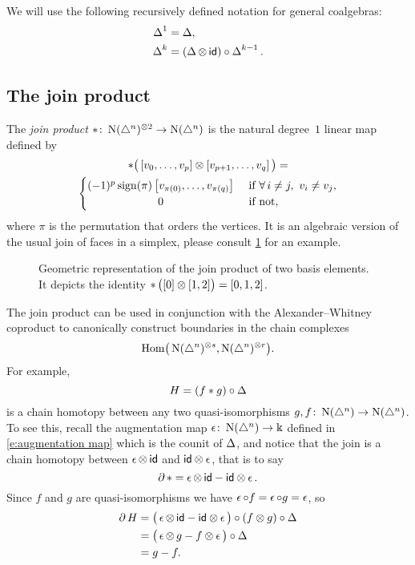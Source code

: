 We will use the following recursively defined notation for general coalgebras:
\begin{align*}
	\operatorname{\Delta}^1 &= \operatorname{\Delta}, \\
	\operatorname{\Delta}^k &= (\operatorname{\Delta} \otimes \, \mathsf{id}) \circ \operatorname{\Delta}^{k-1}.
\end{align*}

\subsection{The join product}

The \textit{join product} $\ast \colon \operatorname{N}(\triangle^n)^{\otimes 2} \to \operatorname{N}(\triangle^n)$ is the natural degree~$1$ linear map defined by
\begin{multline}
	\ast \big(\left[v_0, \dots, v_p \right] \ot \left[v_{p+1}, \dots, v_q\right]\big) = \\
	\begin{cases} (-1)^{p} \sign(\pi) \left[v_{\pi(0)}, \dots, v_{\pi(q)}\right] & \text{ if } \forall\, i \neq j, \ v_i \neq v_j, \\
		\hfil 0 & \text{ if not}, \end{cases}
\end{multline}
where $\pi$ is the permutation that orders the vertices.
It is an algebraic version of the usual join of faces in a simplex, please consult \cref{f:join of faces} for an example.

\begin{figure}
	
	\caption{Geometric representation of the join product of two basis elements. It depicts the identity $\operatorname{\ast} \big( [0] \otimes [1,2] \big) = [0,1,2]$.}
	\label{f:join of faces}
\end{figure}

The join product can be used in conjunction with the Alexander--Whitney coproduct to canonically construct boundaries in the chain complexes
\[
\mathrm{Hom} \big( \operatorname{N}(\triangle^n)^{\otimes s}, \operatorname{N}(\triangle^n)^{\otimes r} \big).
\]
For example,
\[
H = (f \ast g) \circ \operatorname{\Delta}
\]
is a chain homotopy between any two quasi-isomorphisms $g, f \colon \operatorname{N}(\triangle^n) \to \operatorname{N}(\triangle^n)$.
To see this, recall the augmentation map $\operatorname{\epsilon} \colon \operatorname{N}(\triangle^n) \to \Bbbk$ defined in \eqref{e:augmentation map} which is the counit of $\operatorname{\Delta}$, and notice that the join is a chain homotopy between $\operatorname{\epsilon} \otimes \, \mathsf{id}$ and $\mathsf{id} \otimes \operatorname{\epsilon}$, that is to say
\begin{equation}
	\operatorname{\partial} \operatorname{\ast} = \operatorname{\epsilon} \otimes \, \mathsf{id} - \mathsf{id} \otimes \operatorname{\epsilon}.
\end{equation}
Since $f$ and $g$ are quasi-isomorphisms we have $\operatorname{\epsilon} \circ f = \operatorname{\epsilon} \circ g = \operatorname{\epsilon}$, so
\begin{align*}
	\operatorname{\partial} H &=
	\big( \operatorname{\epsilon} \otimes \, \mathsf{id} - \mathsf{id} \otimes \operatorname{\epsilon} \big) \circ (f \otimes g) \circ \operatorname{\Delta} \\ &=
	\big(\operatorname{\epsilon} \otimes \, g - f \otimes \operatorname{\epsilon} \big) \circ \operatorname{\Delta} \\ &= g - f.
\end{align*}

